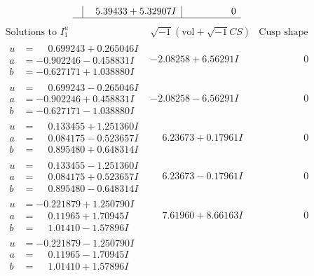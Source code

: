 \documentclass[1p]{elsarticle_modified}
\theoremstyle{definition}
\newcommand{\I}{\sqrt{-1}}
\begin{document}
$$\begin{array}{c|c|c}
 & \phantom{-}5.39433 + 5.32907 I & \phantom{-0.000000 } 0\\
 \hline 
 \end{array}$$\newpage$$\begin{array}{c|c|c}  
\text{Solutions to }I^u_{1}& \I (\text{vol} + \sqrt{-1}CS) & \text{Cusp shape}\\
 \hline 
\begin{aligned}
u &= \phantom{-}0.699243 + 0.265046 I \\
a &= -0.902246 - 0.458831 I \\
b &= -0.627171 + 1.038880 I\end{aligned}
 & -2.08258 + 6.56291 I & \phantom{-0.000000 } 0 \\ \hline\begin{aligned}
u &= \phantom{-}0.699243 - 0.265046 I \\
a &= -0.902246 + 0.458831 I \\
b &= -0.627171 - 1.038880 I\end{aligned}
 & -2.08258 - 6.56291 I & \phantom{-0.000000 } 0 \\ \hline\begin{aligned}
u &= \phantom{-}0.133455 + 1.251360 I \\
a &= \phantom{-}0.084175 - 0.523657 I \\
b &= \phantom{-}0.895480 + 0.648314 I\end{aligned}
 & \phantom{-}6.23673 + 0.17961 I & \phantom{-0.000000 } 0 \\ \hline\begin{aligned}
u &= \phantom{-}0.133455 - 1.251360 I \\
a &= \phantom{-}0.084175 + 0.523657 I \\
b &= \phantom{-}0.895480 - 0.648314 I\end{aligned}
 & \phantom{-}6.23673 - 0.17961 I & \phantom{-0.000000 } 0 \\ \hline\begin{aligned}
u &= -0.221879 + 1.250790 I \\
a &= \phantom{-}0.11965 + 1.70945 I \\
b &= \phantom{-}1.01410 - 1.57896 I\end{aligned}
 & \phantom{-}7.61960 + 8.66163 I & \phantom{-0.000000 } 0 \\ \hline\begin{aligned}
u &= -0.221879 - 1.250790 I \\
a &= \phantom{-}0.11965 - 1.70945 I \\
b &= \phantom{-}1.01410 + 1.57896 I\end{aligned}

\end{array}$$
\end{document}
